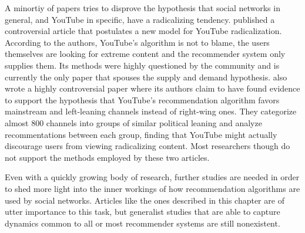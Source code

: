 A minortiy of papers tries to disprove the hypothesis that social networks in
general, and YouTube in specific, have a radicalizing tendency.
\citet{munger_right-wing_2020} published a controversial article that postulates
a new model for YouTube radicalization. According to the authors, YouTube's
algorithm is not to blame, the users themselves are looking for extreme content
and the recommender system only supplies them. Its methods were highly
questioned by the community and is currently the only paper that spouses the
supply and demand hypothesis. \citet{ledwich_algorithmic_2019} also wrote a
highly controversial paper where its authors claim to have found evidence to
support the hypothesis that YouTube's recommendation algorithm favors mainstream
and left-leaning channels instead of right-wing ones. They categorize almost 800
channels into groups of similar political leaning and analyze recommentations
between each group, finding that YouTube might actually discourage users from
viewing radicalizing content. Most researchers though do not support the methods
employed by these two articles.

Even with a quickly growing body of research, further studies are needed in
order to shed more light into the inner workings of how recommendation
algorithms are used by social networks. Articles like the ones described in this
chapter are of utter importance to this task, but generalist studies that are
able to capture dynamics common to all or most recommender systems are still
nonexistent.
